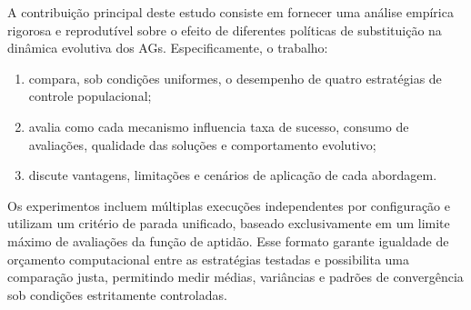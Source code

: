 A contribuição principal deste estudo consiste em fornecer uma análise empírica rigorosa e reprodutível sobre o efeito de diferentes políticas de substituição na dinâmica evolutiva dos AGs. Especificamente, o trabalho:

\begin{enumerate}
\item compara, sob condições uniformes, o desempenho de quatro estratégias de controle populacional;
\item avalia como cada mecanismo influencia taxa de sucesso, consumo de avaliações, qualidade das soluções e comportamento evolutivo;
\item discute vantagens, limitações e cenários de aplicação de cada abordagem.
\end{enumerate}

Os experimentos incluem múltiplas execuções independentes por configuração e utilizam um critério de parada unificado, baseado exclusivamente em um limite máximo de avaliações da função de aptidão. Esse formato garante igualdade de orçamento computacional entre as estratégias testadas e possibilita uma comparação justa, permitindo medir médias, variâncias e padrões de convergência sob condições estritamente controladas.